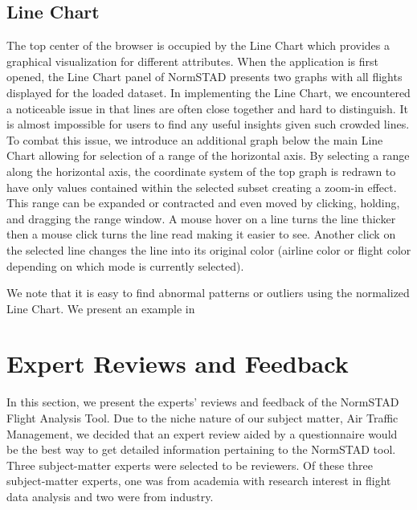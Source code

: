 \documentclass{sig-alternate}
\begin{document}
\subsection{Line Chart}
\label{subsec-linechart}
The top center of the browser is occupied by the Line Chart which provides a graphical
visualization for different attributes. When the application is first opened,
the Line Chart panel of NormSTAD presents two graphs with all flights displayed for the loaded
dataset. In implementing the Line Chart, we encountered a noticeable issue in that lines are often
close together and hard to distinguish. It is almost impossible for users to find any useful insights
given such crowded lines. To combat this issue, we introduce an additional graph below the main
Line Chart allowing for selection of a range of the horizontal axis. By selecting a range along 
the horizontal axis, the coordinate system of the top graph is redrawn to have only values contained within
the selected subset creating a zoom-in effect. This range can be expanded or contracted and even moved
by clicking, holding, and dragging the range window. A mouse hover on a line turns the line thicker
then a mouse click turns the line read making it easier to see. Another click on the selected 
line changes the line into its original color (airline color or flight color depending on 
which mode is currently selected). 

We note that it is easy to find abnormal patterns or outliers using the normalized Line Chart. We 
present an example in

\section{Expert Reviews and Feedback}
\label{sec-expert-review}

In this section, we present the experts' reviews and feedback of the NormSTAD Flight 
Analysis Tool. Due to the niche nature of our subject matter, Air Traffic Management, we decided
that an expert review aided by a questionnaire would be the best way to get detailed
information pertaining to the NormSTAD tool. Three subject-matter experts were selected
to be reviewers. Of these three subject-matter experts, one was from academia with 
research interest in flight data analysis and two were from industry. 
\end{document}
